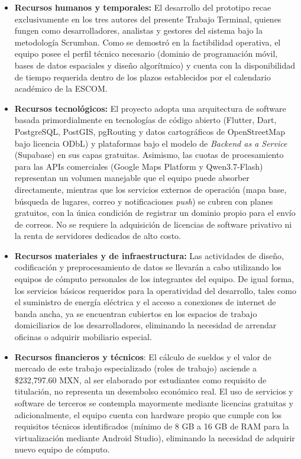 \begin{itemize}
    \item \textbf{Recursos humanos y temporales:} El desarrollo del prototipo recae exclusivamente en los tres autores del presente Trabajo Terminal, quienes fungen como desarrolladores, analistas y gestores del sistema bajo la metodología Scrumban. Como se demostró en la factibilidad operativa, el equipo posee el perfil técnico necesario (dominio de programación móvil, bases de datos espaciales y diseño algorítmico) y cuenta con la disponibilidad de tiempo requerida dentro de los plazos establecidos por el calendario académico de la ESCOM.
    
    \item \textbf{Recursos tecnológicos:} El proyecto adopta una arquitectura de software basada primordialmente en tecnologías de código abierto (Flutter, Dart, PostgreSQL, PostGIS, pgRouting y datos cartográficos de OpenStreetMap bajo licencia ODbL) y plataformas bajo el modelo de \textit{Backend as a Service} (Supabase) en sus capas gratuitas. Asimismo, las cuotas de procesamiento para las APIs comerciales (Google Maps Platform y Qwen3.7-Flash) representan un volumen manejable que el equipo puede absorber directamente, mientras que los servicios externos de operación (mapa base, búsqueda de lugares, correo y notificaciones \textit{push}) se cubren con planes gratuitos, con la única condición de registrar un dominio propio para el envío de correos. No se requiere la adquisición de licencias de software privativo ni la renta de servidores dedicados de alto costo.
    
    \item \textbf{Recursos materiales y de infraestructura:} Las actividades de diseño, codificación y preprocesamiento de datos se llevarán a cabo utilizando los equipos de cómputo personales de los integrantes del equipo. De igual forma, los servicios básicos requeridos para la operatividad del desarrollo, tales como el suministro de energía eléctrica y el acceso a conexiones de internet de banda ancha, ya se encuentran cubiertos en los espacios de trabajo domiciliarios de los desarrolladores, eliminando la necesidad de arrendar oficinas o adquirir mobiliario especial.

    \item\textbf{Recursos financieros y técnicos}: El cálculo de sueldos y el valor de mercado de este trabajo especializado (roles de trabajo) asciende a \$232,797.60 MXN, al ser elaborado por estudiantes como requisito de titulación, no representa un desembolso económico real. El uso de servicios y software de terceros se contempla mayormente mediante licencias gratuitas y adicionalmente, el equipo cuenta con hardware propio que cumple con los requisitos técnicos identificados (mínimo de 8 GB a 16 GB de RAM para la virtualización mediante Android Studio), eliminando la necesidad de adquirir nuevo equipo de cómputo.


\end{itemize}
